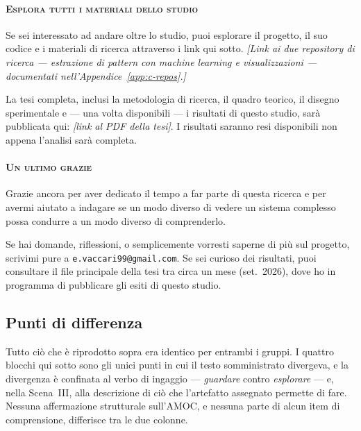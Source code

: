 \paragraph{\textsc{Esplora tutti i materiali dello studio}}
Se sei interessato ad andare oltre lo studio, puoi esplorare il progetto, il suo codice e i
materiali di ricerca attraverso i link qui sotto. \emph{[Link ai due repository di ricerca ---
estrazione di pattern con machine learning e visualizzazioni --- documentati nell'Appendice~\ref{app:c-repos}.]}

La tesi completa, inclusi la metodologia di ricerca, il quadro teorico, il disegno sperimentale e
--- una volta disponibili --- i risultati di questo studio, sarà pubblicata qui: \emph{[link al PDF
della tesi]}. I risultati saranno resi disponibili non appena l'analisi sarà completa.

\paragraph{\textsc{Un ultimo grazie}}
Grazie ancora per aver dedicato il tempo a far parte di questa ricerca e per avermi aiutato a
indagare se un modo diverso di vedere un sistema complesso possa condurre a un modo diverso di
comprenderlo.

Se hai domande, riflessioni, o semplicemente vorresti saperne di più sul progetto, scrivimi pure a
\texttt{e.vaccari99@gmail.com}. Se sei curioso dei risultati, puoi consultare il file principale
della tesi tra circa un mese (set.\ 2026), dove ho in programma di pubblicare gli esiti di questo
studio.

\normalsize

\subsection{Punti di differenza}
\label{subsec:b-difference}

Tutto ciò che è riprodotto sopra era identico per entrambi i gruppi. I quattro blocchi qui sotto sono
gli unici punti in cui il testo somministrato divergeva, e la divergenza è confinata al verbo di
ingaggio --- \emph{guardare} contro \emph{esplorare} --- e, nella Scena~III, alla descrizione di ciò
che l'artefatto assegnato permette di fare. Nessuna affermazione strutturale sull'AMOC, e nessuna
parte di alcun item di comprensione, differisce tra le due colonne.

